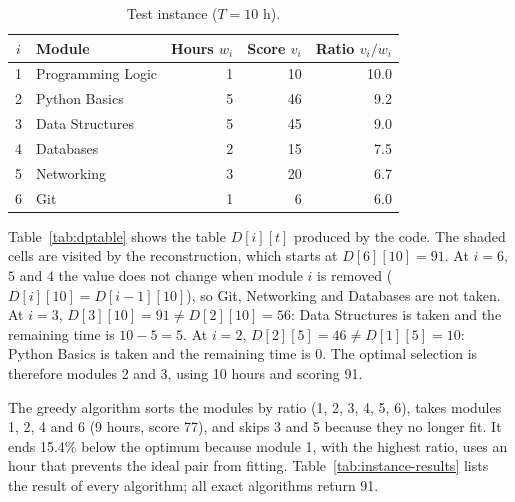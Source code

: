 \begin{table}[h]
\centering
\caption{Test instance ($T=10$ h).}\label{tab:instance}
\small
\begin{tabular}{@{}c l r r r@{}}
\toprule
$i$ & Module & Hours $w_i$ & Score $v_i$ & Ratio $v_i/w_i$\\
\midrule
1 & Programming Logic & 1 & 10 & 10.0\\
2 & Python Basics & 5 & 46 & 9.2\\
3 & Data Structures & 5 & 45 & 9.0\\
4 & Databases & 2 & 15 & 7.5\\
5 & Networking & 3 & 20 & 6.7\\
6 & Git & 1 & 6 & 6.0\\
\bottomrule
\end{tabular}
\end{table}

Table~\ref{tab:dptable} shows the table $D[i][t]$ produced by the code. The shaded cells are visited by the reconstruction, which starts at $D[6][10]=91$. At $i=6$, $5$ and $4$ the value does not change when module $i$ is removed ($D[i][10]=D[i-1][10]$), so Git, Networking and Databases are not taken. At $i=3$, $D[3][10]=91\neq D[2][10]=56$: Data Structures is taken and the remaining time is $10-5=5$. At $i=2$, $D[2][5]=46\neq D[1][5]=10$: Python Basics is taken and the remaining time is $0$. The optimal selection is therefore modules 2 and 3, using 10 hours and scoring 91.

\begin{table}[h]
\centering
\caption{Dynamic-programming table for the test instance. Rows: modules considered; columns: available time $t$. Shaded: cells visited by the reconstruction; bold: modules taken.}\label{tab:dptable}
\small

\end{table}

The greedy algorithm sorts the modules by ratio (1, 2, 3, 4, 5, 6), takes modules 1, 2, 4 and 6 (9 hours, score 77), and skips 3 and 5 because they no longer fit. It ends 15.4\% below the optimum because module 1, with the highest ratio, uses an hour that prevents the ideal pair from fitting. Table~\ref{tab:instance-results} lists the result of every algorithm; all exact algorithms return 91.

